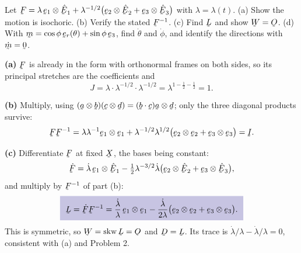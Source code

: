 \begin{problem}[Spin of a fibre when $\bW=\Ob$]
Let $\bF=\lambda\,\be_{1}\otimes\hbE_{1}
+\lambda^{-1/2}\big(\be_{2}\otimes\hbE_{2}+\be_{3}\otimes\hbE_{3}\big)$
with $\lambda=\lambda(t)$.
(a) Show the motion is isochoric. (b) Verify the stated $\bF^{-1}$.
(c) Find $\bL$ and show $\bW=\Ob$. (d) With
$\bm=\cos\phi\,\ber(\theta)+\sin\phi\,\be_{3}$, find $\dot\theta$ and
$\dot\phi$, and identify the directions with $\dot\bm=\bze$.
\end{problem}

\begin{solution}
\textbf{(a)} $\bF$ is already in the form  with orthonormal frames
on both sides, so its principal stretches are the coefficients and
\[
   J=\lambda\cdot\lambda^{-1/2}\cdot\lambda^{-1/2}
   =\lambda^{1-\frac12-\frac12}=1 .
\]

\textbf{(b)} Multiply, using $(\ba\otimes\bb)(\bc\otimes\bd)
=(\ip\bb\bc)\ba\otimes\bd$; only the three diagonal products survive:
\[
   \bF\bF^{-1}=\lambda\lambda^{-1}\be_{1}\otimes\be_{1}
   +\lambda^{-1/2}\lambda^{1/2}\big(\be_{2}\otimes\be_{2}
   +\be_{3}\otimes\be_{3}\big)=\I .
\]

\textbf{(c)} Differentiate $\bF$ at fixed $\bX$, the bases being constant:
\[
   \dot\bF=\dot\lambda\,\be_{1}\otimes\hbE_{1}
   -\tfrac12\lambda^{-3/2}\dot\lambda
   \big(\be_{2}\otimes\hbE_{2}+\be_{3}\otimes\hbE_{3}\big),
\]
and multiply by $\bF^{-1}$ of part (b):
\[
   \boxed{\ \bL=\dot\bF\bF^{-1}
   =\frac{\dot\lambda}{\lambda}\,\be_{1}\otimes\be_{1}
   -\frac{\dot\lambda}{2\lambda}
   \big(\be_{2}\otimes\be_{2}+\be_{3}\otimes\be_{3}\big).\ }
\]
This is symmetric, so $\bW=\Skw\bL=\Ob$ and $\bD=\bL$. Its trace is
$\dot\lambda/\lambda-\dot\lambda/\lambda=0$, consistent with (a) and
Problem 2.


\end{solution}
